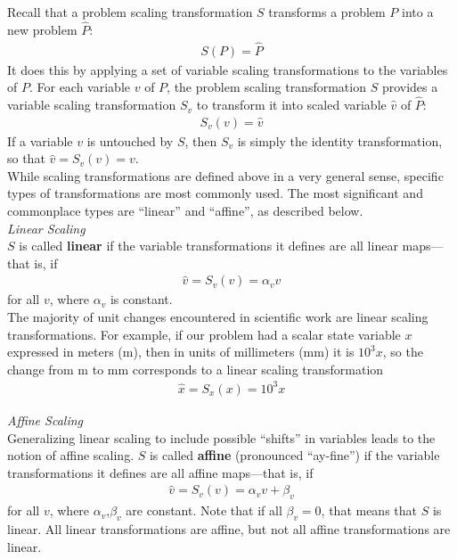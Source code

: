 \documentclass{article}
\begin{document}
Recall that a problem scaling transformation $S$ transforms a problem $P$ into a new problem $\hat{P}$:
\begin{align*}
    S(P) = \hat{P}
\end{align*}
It does this by applying a set of variable scaling transformations to the variables of $P$. For each variable $v$ of $P$, the problem scaling transformation $S$ provides a variable scaling transformation $S_v$ to transform it into scaled variable $\hat{v}$ of $\hat{P}$:
\begin{align*}
    S_v(v) = \hat{v}
\end{align*}
If a variable $v$ is untouched by $S$, then $S_v$ is simply the identity transformation, so that $\hat{v} = S_v(v) = v$. \\

\noindent
While scaling transformations are defined above in a very general sense, specific types of transformations are most commonly used. The most significant and commonplace types are ``linear'' and ``affine'', as described below. \\

\noindent \textit{Linear Scaling} \\

\noindent
$S$ is called \textbf{linear} if the variable transformations it defines are all linear maps---that is, if
\begin{align*}
    \hat{v} = S_v(v) = \alpha_v v
\end{align*}
for all $v$, where $\alpha_v$ is constant. \\

\noindent
The majority of unit changes encountered in scientific work are linear scaling transformations. For example, if our problem had a scalar state variable $x$ expressed in meters (m), then in units of millimeters (mm) it is $10^3x$, so the change from m to mm corresponds to a linear scaling transformation
\begin{align*}
    \hat{x} = S_x(x) = 10^3x
\end{align*}


\noindent \textit{Affine Scaling} \\

\noindent
Generalizing linear scaling to include possible ``shifts'' in variables leads to the notion of affine scaling. $S$ is called \textbf{affine} (pronounced ``ay-fine'') if the variable transformations it defines are all affine maps---that is, if
\begin{align*}
    \hat{v} = S_v(v) = \alpha_v v + \beta_v
\end{align*}
for all $v$, where $\alpha_v$,$\beta_v$ are constant. Note that if all $\beta_v = 0$, that means that $S$ is linear. All linear transformations are affine, but not all affine transformations are linear. \\
\end{document}
